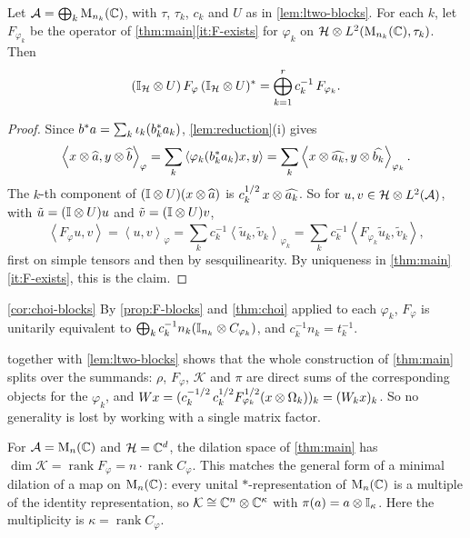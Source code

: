 \documentclass[12pt]{article}
\newcommand{\alg}{\mathcal{A}}             %
\newcommand{\hilb}{\mathcal{H}}            %
\newcommand{\dil}{\mathcal{K}}             %
\newcommand{\ip}[2]{\left\langle #1 , #2 \right\rangle}
\newcommand{\ipphi}[2]{\left\langle #1 , #2 \right\rangle_{\varphi}}
\newcommand{\Ltwo}{L^2\br{\alg}}           %
\newcommand{\vect}[1]{\widehat{#1}}        %
\newcommand{\Ltn}{\hilb \tensor \Ltwo}     %
\newcommand{\Fphi}{F_{\varphi}}            %
\newcommand{\Choi}{C_{\varphi}}            %
\begin{document}
\begin{proposition}
\label{prop:F-blocks}
Let \(\alg = \bigoplus_k \mathrm{M}_{n_k}(\complex)\), with \(\tau\), \(\tau_k\),
\(c_k\) and \(U\) as in \cref{lem:ltwo-blocks}. For each \(k\), let
\(F_{\varphi_k}\) be the operator of \cref{thm:main}\ref{it:F-exists} for
\(\varphi_k\) on \(\hilb \tensor L^2(\mathrm{M}_{n_k}(\complex), \tau_k)\). Then
\[
  (\id_{\hilb} \tensor U)\,\Fphi\,(\id_{\hilb} \tensor U)^\adjoint
  = \bigoplus_{k=1}^r c_k^{-1}\, F_{\varphi_k}.
\]
\end{proposition}
\begin{proof}
Since \(b^* a = \sum_k \iota_k(b_k^* a_k)\), \cref{lem:reduction}(i)
gives
\[
  \ipphi{x \tensor \vect{a}}{y \tensor \vect{b}}
  = \sum_k \ip{\varphi_k(b_k^\adjoint a_k)x}{y}
  = \sum_k \ip{x \tensor \vect{a_k}}{y \tensor \vect{b_k}}_{\varphi_k}.
\]
The \(k\)-th component of \((\id \tensor U)(x \tensor \vect{a})\) is
\(c_k^{1/2}\, x \tensor \vect{a_k}\). So for \(u, v \in \Ltn\), with
\(\tilde{u} = ({\mathbb I} \otimes U)u\) and \(\tilde{v} = ({\mathbb I} \otimes U)v\),
\[
  \ip{\Fphi u}{v} = \ipphi{u}{v}
  = \sum_k c_k^{-1}\ip{\tilde{u}_k}{\tilde{v}_k}_{\varphi_k}
  = \sum_k c_k^{-1}\ip{F_{\varphi_k}\tilde{u}_k}{\tilde{v}_k},
\]
first on simple tensors and then by sesquilinearity. By uniqueness in
\cref{thm:main}\ref{it:F-exists}, this is the claim.
\end{proof}

\begin{proofof}{\cref{cor:choi-blocks}}
By \cref{prop:F-blocks} and \cref{thm:choi} applied to each \(\varphi_k\),
\(\Fphi\) is unitarily equivalent to
\(\bigoplus_k c_k^{-1} n_k ({\mathbb I}_{n_k} \otimes C_{\varphi_k})\), and
\(c_k^{-1} n_k = t_k^{-1}\).
\end{proofof}

\begin{remark}
 together with \cref{lem:ltwo-blocks} shows that the whole
construction of \cref{thm:main} splits over the summands: \(\rho\), \(\Fphi\),
\(\dil\) and \(\pi\) are direct sums of the corresponding objects for the
\(\varphi_k\), and \(W x = (c_k^{-1/2}\, c_k^{1/2} F_{\varphi_k}^{1/2}(x \otimes
\Omega_k))_k = (W_k x)_k\). So no generality is lost by working with a single
matrix factor.
\end{remark}

\begin{remark}
For \(\alg = \mathrm{M}_n(\complex)\) and \(\hilb = \complex^d\), the dilation space
of \cref{thm:main} has
\(\dim \dil = \operatorname{rank}\Fphi = n \cdot \operatorname{rank}\Choi\).
This matches the general form of a minimal dilation of a map on
\(\mathrm{M}_n({\mathbb C})\): every unital \(*\)-representation of
\(\mathrm{M}_n({\mathbb C})\) is a multiple of the identity representation, so
\(\dil \cong \complex^n \tensor \complex^{\kappa}\) with
\(\pi(a) = a \otimes {\mathbb I}_\kappa\). Here the multiplicity is
\(\kappa = \operatorname{rank}\Choi\).
\end{remark}
\end{document}
